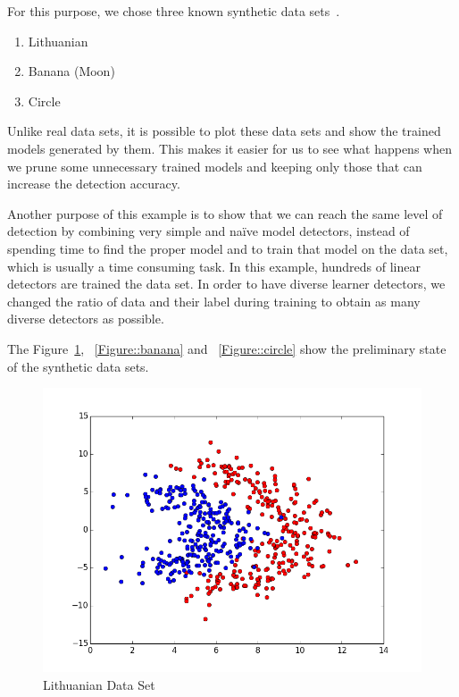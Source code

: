 For this purpose, we chose three known synthetic data sets~\cite{Duin2000}. 
\begin{enumerate}
  \item Lithuanian
  \item Banana (Moon)
  \item Circle
\end{enumerate}  
Unlike real data sets, it is possible to plot these data sets and show the trained models generated by them. This makes it easier for us to see what happens when we prune some unnecessary trained models and keeping only those that can increase the detection accuracy.

Another purpose of this example is to show that we can reach the same level of detection by combining very simple and naïve model detectors, instead of spending time to find the proper model and to train that model on the data set, which is usually a time consuming task. In this example, hundreds of linear detectors  are trained the data set. In order to have diverse learner detectors, we changed the ratio of data and their label during training to obtain as many diverse detectors as possible.

The Figure~\ref{Figure::lithuanian}, ~\ref{Figure::banana} and  ~\ref{Figure::circle} show the preliminary state of the synthetic data sets.

\begin{figure}[]
\centering
\includegraphics[scale=0.6]{figs/dataset_Lithuanian}
\caption{Lithuanian Data Set}
\label{Figure::lithuanian}
\end{figure}

